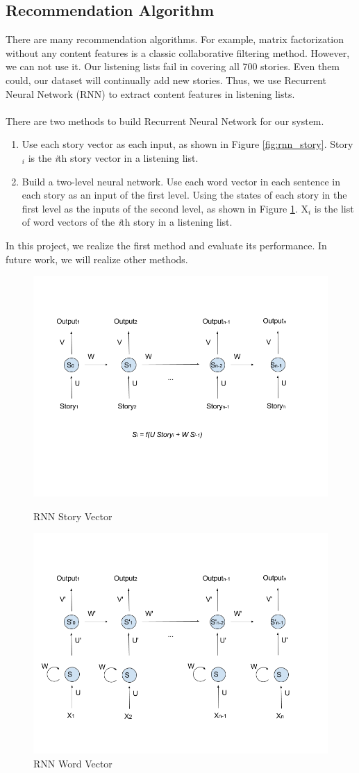\documentclass[sigconf]{acmart}
\begin{document}
\subsection{Recommendation Algorithm}
There are many recommendation algorithms. For example, matrix factorization without any content features is a classic collaborative filtering method. However, we can not use it. Our listening lists fail in covering all 700 stories. Even them could, our dataset will continually add new stories. 
Thus, we use Recurrent Neural Network (RNN) to extract content features in listening lists.
\\\\
There are two methods to build Recurrent Neural Network for our system.
\begin{enumerate}
\item Use each story vector as each input, as shown in Figure \ref{fig:rnn_story}. Story$_i$ is the \emph{i}th story vector in a listening list. 
\item Build a two-level neural network. Use each word vector in each sentence in each story as an input of the first level. Using the states of each story in the first level as the inputs of the second level, as shown in Figure \ref{fig:rnn_word}. X$_i$ is the list of word vectors of the \emph{i}th story in a listening list. 
\end{enumerate}
In this project, we realize the first method and evaluate its performance. In future work, we will realize other methods.

\begin{figure}
\includegraphics[width = .45\textwidth]{rnn_story.png}
\caption{RNN Story Vector}
\label{fig:rnn_story}

\includegraphics[width = .45\textwidth]{rnn_word.png}
\caption{RNN Word Vector}
\label{fig:rnn_word}
\end{figure}
\end{document}
